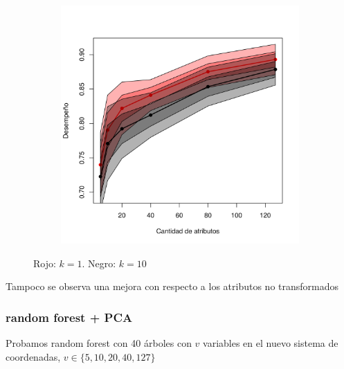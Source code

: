 \documentclass[a4paper,10pt]{article}
\begin{document}
\begin{figure}[H]
  \centering
  \begin{subfigure}[b]{0.4\textwidth}
    \includegraphics[width=\textwidth]{../imagenes/knn}
  \end{subfigure}
  \caption{Rojo: $k=1$. Negro: $k=10$ }
  \label{fig:knn-n_neighbors}
\end{figure}

Tampoco se observa una mejora con respecto a los atributos no transformados

\subsubsection{random forest + PCA}

Probamos random forest con 40 \'arboles con $v$ variables en el nuevo sistema de coordenadas, $v \in \{5,10,20,40,127\}$
\end{document}
